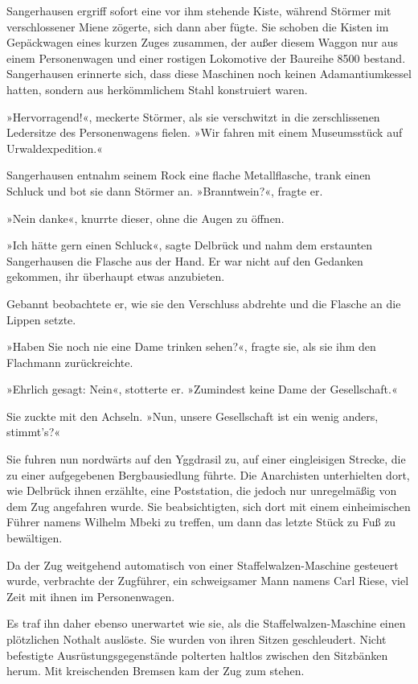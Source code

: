 Sangerhausen ergriff sofort eine vor ihm stehende Kiste, während
Störmer mit verschlossener Miene zögerte, sich dann aber fügte. Sie
schoben die Kisten im Gepäckwagen eines kurzen Zuges zusammen, der
außer diesem Waggon nur aus einem Personenwagen und einer rostigen
Lokomotive der Baureihe 8500 bestand. Sangerhausen erinnerte sich,
dass diese Maschinen noch keinen Adamantiumkessel hatten, sondern
aus herkömmlichem Stahl konstruiert waren.

»Hervorragend!«, meckerte Störmer, als sie verschwitzt in die
zerschlissenen Ledersitze des Personenwagens fielen. »Wir fahren
mit einem Museumsstück auf Urwaldexpedition.«

Sangerhausen entnahm seinem Rock eine flache Metallflasche, trank
einen Schluck und bot sie dann Störmer an. »Branntwein?«, fragte
er.

»Nein danke«, knurrte dieser, ohne die Augen zu öffnen.

»Ich hätte gern einen Schluck«, sagte Delbrück und nahm dem
erstaunten Sangerhausen die Flasche aus der Hand. Er war nicht auf
den Gedanken gekommen, ihr überhaupt etwas anzubieten.

Gebannt beobachtete er, wie sie den Verschluss abdrehte und die
Flasche an die Lippen setzte.

»Haben Sie noch nie eine Dame trinken sehen?«, fragte sie, als sie
ihm den Flachmann zurückreichte.

»Ehrlich gesagt: Nein«, stotterte er. »Zumindest keine Dame der
Gesellschaft.«

Sie zuckte mit den Achseln. »Nun, unsere Gesellschaft ist ein wenig
anders, stimmt's?«

\bigpar

Sie fuhren nun nordwärts auf den Yggdrasil zu, auf einer
eingleisigen Strecke, die zu einer aufgegebenen Bergbausiedlung
führte. Die Anarchisten unterhielten dort, wie Delbrück ihnen
erzählte, eine Poststation, die jedoch nur unregelmäßig von dem Zug
angefahren wurde. Sie beabsichtigten, sich dort mit einem
einheimischen Führer namens Wilhelm Mbeki zu treffen, um dann das
letzte Stück zu Fuß zu bewältigen.

Da der Zug weitgehend automatisch von einer Staffelwalzen-Maschine
gesteuert wurde, verbrachte der Zugführer, ein schweigsamer Mann
namens Carl Riese, viel Zeit mit ihnen im Personenwagen.

Es traf ihn daher ebenso unerwartet wie sie, als die
Staffelwalzen-Maschine einen plötzlichen Nothalt auslöste. Sie
wurden von ihren Sitzen geschleudert. Nicht befestigte
Ausrüstungsgegenstände polterten haltlos zwischen den Sitzbänken
herum. Mit kreischenden Bremsen kam der Zug zum stehen.

